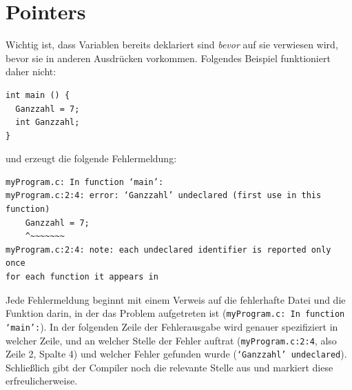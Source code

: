 {{{{\section{Pointers}




Wichtig ist, dass Variablen bereits deklariert sind \emph{bevor} auf sie verwiesen wird, \ie bevor sie in anderen Ausdrücken vorkommen. Folgendes Beispiel funktioniert daher nicht:
\begin{codebox}
\begin{verbatim}
int main () {
  Ganzzahl = 7;
  int Ganzzahl;
}
\end{verbatim}
\end{codebox}
und erzeugt die folgende Fehlermeldung:
\begin{cmdbox}
\begin{verbatim}
myProgram.c: In function ‘main’:
myProgram.c:2:4: error: ‘Ganzzahl’ undeclared (first use in this
function)
    Ganzzahl = 7;
    ^~~~~~~~
myProgram.c:2:4: note: each undeclared identifier is reported only once
for each function it appears in
\end{verbatim}
\end{cmdbox}
Jede Fehlermeldung beginnt mit einem Verweis auf die fehlerhafte Datei und die Funktion darin, in der das Problem aufgetreten ist (\texttt{myProgram.c: In function ‘main’:}). In der folgenden Zeile der Fehlerausgabe wird genauer spezifiziert in welcher Zeile, und an welcher Stelle der Fehler auftrat (\texttt{myProgram.c:2:4}, also  Zeile 2, Spalte 4) und welcher Fehler gefunden wurde (\texttt{‘Ganzzahl’ undeclared}). Schließlich gibt der Compiler noch die relevante Stelle aus und markiert diese erfreulicherweise.

}}}}
